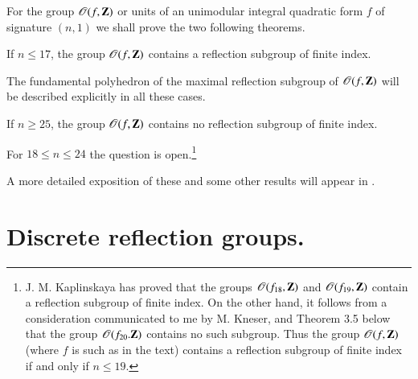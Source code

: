 For the group $\mathscr{O}(f, \mathbf{Z})$ or units of an unimodular integral quadratic form $f$ of signature $(n,1)$ we shall prove the two following theorems. 


\begin{alphtheorem}\label{art10-alphathmA}
If  $n \leqslant 17$, the group $\mathscr{O} (f, \mathbf{Z})$ contains a reflection subgroup of finite index.
\end{alphtheorem}

The fundamental polyhedron of the maximal reflection subgroup of $\mathscr{O} (f, \mathbf{Z})$ will be described explicitly in all these cases.

\begin{alphtheorem}\label{art10-alphathmB}
If $n \geqslant 25$, the group $\mathscr{O} (f, \mathbf{Z})$ contains no reflection subgroup of finite index.
\end{alphtheorem}

For $18 \leqslant n \leqslant 24$ the question is open.\footnote{J. M. Kaplinskaya has proved that the groups $\mathscr{O}(f_{18}, \mathbf{Z})$ and $\mathscr{O} (f_{19}, \mathbf{Z})$ contain a reflection subgroup of finite index. On the other hand, it follows from a consideration communicated to me by M. Kneser, and Theorem 3.5 below that the group $\mathscr{O} (f_{20}. \mathbf{Z})$ contains no such subgroup. Thus the group $\mathscr{O} (f, \mathbf{Z})$ (where $f$ is such as in the text) contains a reflection subgroup of finite index if and only if $n \leqslant 19$.}

A more detailed exposition of these and some other results will appear in \cite{art10-key13, art10-key14}.

\section{Discrete reflection groups.}\label{art10-sec1}

